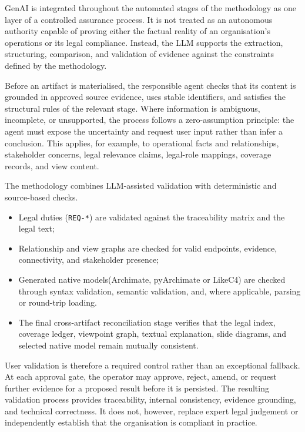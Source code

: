 \ac{GenAI} is integrated throughout the automated stages of the methodology as one layer of a controlled assurance process. It is not treated as an autonomous authority capable of proving either the factual reality of an organisation's operations or its legal compliance. Instead, the \ac{LLM} supports the extraction, structuring, comparison, and validation of evidence against the constraints defined by the methodology.

Before an artifact is materialised, the responsible agent checks that its content is grounded in approved source evidence, uses stable identifiers, and satisfies the structural rules of the relevant stage. Where information is ambiguous, incomplete, or unsupported, the process follows a zero-assumption principle: the agent must expose the uncertainty and request user input rather than infer a conclusion. This applies, for example, to operational facts and relationships, stakeholder concerns, legal relevance claims, legal-role mappings, coverage records, and view content.

The methodology combines \ac{LLM}-assisted validation with deterministic and source-based checks. 
\begin{itemize}
    \item Legal duties (\texttt{REQ-*}) are validated against the traceability matrix and the legal text;
    \item Relationship and view graphs are checked for valid endpoints, evidence, connectivity, and stakeholder presence;
    \item Generated native models(Archimate, pyArchimate or LikeC4) are checked through syntax validation, semantic validation, and, where applicable, parsing or round-trip loading.
    \item The final cross-artifact reconciliation stage verifies that the legal index, coverage ledger, viewpoint graph, textual explanation, slide diagrams, and selected native model remain mutually consistent.
\end{itemize}

User validation is therefore a required control rather than an exceptional fallback. At each approval gate, the operator may approve, reject, amend, or request further evidence for a proposed result before it is persisted. The resulting validation process provides traceability, internal consistency, evidence grounding, and technical correctness. It does not, however, replace expert legal judgement or independently establish that the organisation is compliant in practice.

